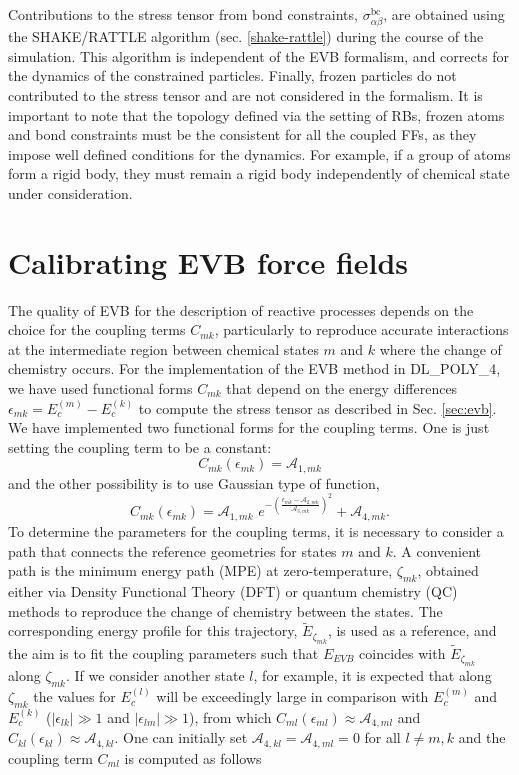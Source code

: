Contributions to the stress tensor from bond constraints, $\sigma_{\alpha\beta}^{\text{bc}}$, are obtained using the SHAKE/RATTLE algorithm (sec. \ref{shake-rattle}) during the course of the simulation. This algorithm is independent of the EVB formalism, and corrects for the dynamics of the constrained particles. Finally, frozen particles do not contributed to the stress tensor and are not considered in the formalism. It is important to note that the topology defined via the setting of RBs, frozen atoms and bond constraints must be the consistent for all the coupled FFs, as they impose well defined conditions for the dynamics. For example, if a group of atoms form a rigid body, they must remain a rigid body independently of chemical state under consideration.

\section{Calibrating EVB force fields}\label{sec:evb-calibrate}
The quality of EVB for the description of reactive processes depends on the choice for the coupling terms $C_{mk}$, particularly to reproduce accurate interactions at the intermediate region between chemical states $m$ and $k$ where the change of chemistry occurs. For the implementation of the EVB method in DL\_POLY\_4, we have used functional forms $C_{mk}$ that depend on the energy differences $\epsilon_{mk}=E^{(m)}_{c}-E^{(k)}_{c}$ to compute the stress tensor as described in Sec. \ref{sec:evb}. We have implemented two functional forms for the coupling terms. One is just setting the coupling term to be a constant:
\begin{equation}\label{eq:coupl-const}
C_{mk}(\epsilon_{mk})=\mathcal{A}_{1,mk}
\end{equation}
and the other possibility is to use Gaussian type of function,
\begin{equation}\label{eq:coupl-gauss}
C_{mk}(\epsilon_{mk})=\mathcal{A}_{1,mk} \, \, e^{-\left( \frac{\epsilon_{mk}-\mathcal{A}_{2,mk}} {\mathcal{A}_{3,mk}}  \right)^2 }+\mathcal{A}_{4,mk}.
\end{equation}
To determine the parameters for the coupling terms, it is necessary to consider a path that connects the reference geometries for states $m$ and $k$. A convenient path is the minimum energy path (MPE) at zero-temperature, $\zeta_{mk}$, obtained either via Density Functional Theory (DFT) or quantum chemistry (QC) methods to reproduce the change of chemistry between the states. The corresponding energy profile for this trajectory, $\tilde{E}_{\zeta_{mk}}$, is used as a reference, and the aim is to fit the coupling parameters such that $E_{EVB}$ coincides with $\tilde{E}_{\zeta_{mk}}$ along $\zeta_{mk}$. If we consider another state $l$, for example, it is expected that along $\zeta_{mk}$ the values for $E^{(l)}_{c}$ will be exceedingly large in comparison with $E^{(m)}_{c}$ and $E^{(k)}_{c}$ ($|\epsilon_{lk}|\gg 1$ and $|\epsilon_{lm}|\gg 1$), from which $C_{ml}(\epsilon_{ml})\approx  \mathcal{A}_{4,ml}$ and $C_{kl}(\epsilon_{kl}) \approx \mathcal{A}_{4,kl}$. One can initially set $\mathcal{A}_{4,kl}=\mathcal{A}_{4,ml}=0$ for all $l\ne m, k$ and the coupling term $C_{ml}$ is computed as follows
